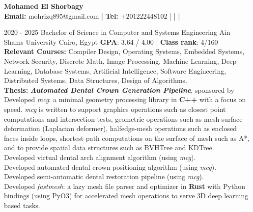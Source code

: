 \documentclass[]{report}
\begin{document}
\begin{center}
    \noindent \Huge{\bfseries Mohamed El Shorbagy}\\[.4em]
    \large
        \textbf{Email:} mohrizq895@gmail.com 
    |   \textbf{Tel:} $+201222448102$
    |   
    |   
    |      
\end{center}

\vspace{2mm}

\large
{}

\entry
    {2020 - 2025} 
    {Bachelor of Science in Computer and Systems Engineering }
    {Ain Shams University}
    {Cairo, Egypt}
    {\tb \textbf{GPA}: 3.64 / 4.00 | \textbf{Class rank}: 4/160 \\  
     \tb \textbf{Relevant Courses:} Compiler Design, Operating Systems, Embedded Systems, Network Security, Discrete Math, Image Processing, Machine Learning, Deep Learning, Database Systems, Artificial Intelligence, Software Engineering, Distributed Systems, Data Structures, Design of Algorithms.\\
     \tb \textbf{Thesis:} \emph{\textbf{Automated Dental Crown Generation Pipeline}}, sponsored by \\
     \tb Developed \emph{mcg}: a minimal geometry processing library in \textbf{C++} with a focus on speed. \emph{mcg} is written to support graphics operations such as closest point computations and intersection tests, geometric operations such as mesh surface deformation (Laplacian deformer), halfedge-mesh operations such as enclosed faces inside loops, shortest path computations on the surface of mesh such as A*, and to provide spatial data structures such as BVHTree and KDTree.\\
     \tb Developed virtual dental arch alignment algorithm (using \emph{mcg}).\\
     \tb Developed automated dental crown positioning algorithm (using \emph{mcg}).\\
     \tb Developed semi-automatic dental restoration pipeline (using \emph{mcg}).\\
     \tb Developed \emph{fastmesh}: a lazy mesh file parser and optimizer in \textbf{Rust} with Python bindings (using PyO3) for accelerated mesh operations to serve 3D deep learning based tasks.
    }  

\vspace{2mm}
\end{document}
